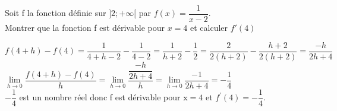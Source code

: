 \documentclass[12pt,a4paper]{article}  %
\begin{document}
\newpage
{}
Soit f la fonction définie sur $] 2 ;+\infty[$ par $f(x)=\dfrac{1}{x-2}$.\\
Montrer que la fonction f est dérivable pour $x=4$ et calculer $f'(4)$
\begin{corrBox}
	$f(4+h)-f(4)=\dfrac{1}{4+h-2}-\dfrac{1}{4-2}=\dfrac{1}{h+2}-\dfrac{1}{2}=\dfrac{2}{2(h+2)}-\dfrac{h+2}{2(h+2)}=\dfrac{-h}{2h+4}$\\
	$\lim\limits_{h \rightarrow 0} \dfrac{f(4+h)-f(4)}{h}=\lim\limits_{h \rightarrow 0} \dfrac{\dfrac{-h}{2h+4}}{h}=\lim\limits_{h \rightarrow 0} \dfrac{-1}{2h+4}=-\dfrac{1}{4}$\\
	$-\dfrac{1}{4}$ est un nombre réel donc f est dérivable pour $\mathrm{x}=4$ et $f^{\prime}(4)=-\dfrac{1}{4}$.
\end{corrBox}
\end{document}
